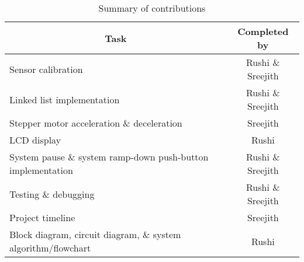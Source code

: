 \begin{table}[h!]
	\centering
	\begin{tabular}{|l|c|} 
		\hline 
		\multicolumn{1}{|c|}{\textbf{Task}}   & \textbf{Completed by} \\
		\hline 
		Sensor calibration & Rushi \& Sreejith \\ 
		\hline 
		Linked list implementation & Rushi \& Sreejith \\ 
		\hline
		Stepper motor acceleration \& deceleration & Sreejith \\ 
		\hline 
		LCD display & Rushi \\ 
		\hline 
		System pause \& system ramp-down push-button implementation & Rushi \& Sreejith \\ 
		\hline 
		Testing \& debugging & Rushi \& Sreejith \\ 
		\hline 
		Project timeline & Sreejith \\ 
		\hline 
		Block diagram, circuit diagram, \& system algorithm/flowchart & Rushi \\ 
		\hline 
	\end{tabular}
	\caption{Summary of contributions}
	\label{table:1}
\end{table}